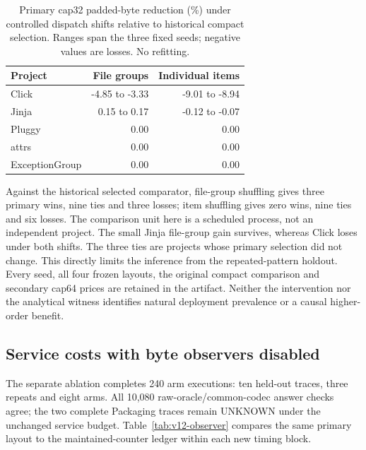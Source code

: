\documentclass[10pt,journal,compsoc]{IEEEtran}
\theoremstyle{definition}\newtheorem{definition}[theorem]{Definition}
\begin{document}
\begin{table}[t]\centering\footnotesize
\caption{Primary cap32 padded-byte reduction (\%) under controlled dispatch
shifts relative to historical compact selection. Ranges span the three
fixed seeds; negative values are losses. No refitting.}
\label{tab:v12-shifts}
\begin{tabular}{@{}lrr@{}}\toprule
Project & File groups & Individual items\\\midrule
Click & -4.85 to -3.33 & -9.01 to -8.94 \\
Jinja & 0.15 to 0.17 & -0.12 to -0.07 \\
Pluggy & 0.00 & 0.00 \\
attrs & 0.00 & 0.00 \\
ExceptionGroup & 0.00 & 0.00 \\
\bottomrule\end{tabular}\end{table}

Against the historical selected comparator, file-group shuffling gives
three primary wins, nine ties and three losses; item shuffling gives zero
wins, nine ties and six losses. The comparison unit here is a scheduled
process, not an independent project. The small Jinja file-group gain survives,
whereas Click loses under both shifts. The three ties are projects whose
primary selection did not change. This directly limits the inference from
the repeated-pattern holdout. Every seed, all four frozen layouts, the
original compact comparison and secondary cap64 prices are retained in
the artifact. Neither the intervention nor the analytical witness identifies
natural deployment prevalence or a causal higher-order benefit.

\subsection{Service costs with byte observers disabled}
The separate ablation completes 240 arm executions: ten held-out traces,
three repeats and eight arms. All 10,080 raw-oracle/common-codec answer
checks agree; the two complete Packaging traces remain UNKNOWN under the
unchanged service budget. Table~\ref{tab:v12-observer} compares the same
primary layout to the maintained-counter ledger within each new timing block.
\end{document}
